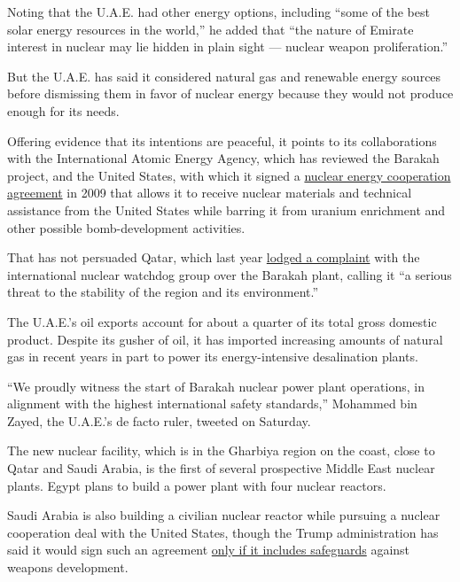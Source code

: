 Noting that the U.A.E. had other energy options, including ``some of the
best solar energy resources in the world,'' he added that ``the nature
of Emirate interest in nuclear may lie hidden in plain sight --- nuclear
weapon proliferation.''

But the U.A.E. has said it considered natural gas and renewable energy
sources before dismissing them in favor of nuclear energy because they
would not produce enough for its needs.

Offering evidence that its intentions are peaceful, it points to its
collaborations with the International Atomic Energy Agency, which has
reviewed the Barakah project, and the United States, with which it
signed a
\href{https://www.reuters.com/article/us-saudi-nuclear-usa/u-s-tells-saudi-arabia-nuclear-push-depends-on-snap-inspections-deal-idUSKBN1W2245}{nuclear
energy cooperation agreement} in 2009 that allows it to receive nuclear
materials and technical assistance from the United States while barring
it from uranium enrichment and other possible bomb-development
activities.

That has not persuaded Qatar, which last year
\href{https://www.reuters.com/article/us-qatar-emirates-nuclearpower-exclusive/exclusive-qatar-asks-iaea-to-intervene-over-threat-posed-by-uae-nuclear-plant-idUSKCN1R120L}{lodged
a complaint} with the international nuclear watchdog group over the
Barakah plant, calling it ``a serious threat to the stability of the
region and its environment.''

The U.A.E.'s oil exports account for about a quarter of its total gross
domestic product. Despite its gusher of oil, it has imported increasing
amounts of natural gas in recent years in part to power its
energy-intensive desalination plants.

``We proudly witness the start of Barakah nuclear power plant
operations, in alignment with the highest international safety
standards,'' Mohammed bin Zayed, the U.A.E.'s de facto ruler, tweeted on
Saturday.

The new nuclear facility, which is in the Gharbiya region on the coast,
close to Qatar and Saudi Arabia, is the first of several prospective
Middle East nuclear plants. Egypt plans to build a power plant with four
nuclear reactors.

Saudi Arabia is also building a civilian nuclear reactor while pursuing
a nuclear cooperation deal with the United States, though the Trump
administration has said it would sign such an agreement
\href{https://www.reuters.com/article/us-saudi-nuclear-usa/u-s-tells-saudi-arabia-nuclear-push-depends-on-snap-inspections-deal-idUSKBN1W2245}{only
if it includes safeguards} against weapons development.

